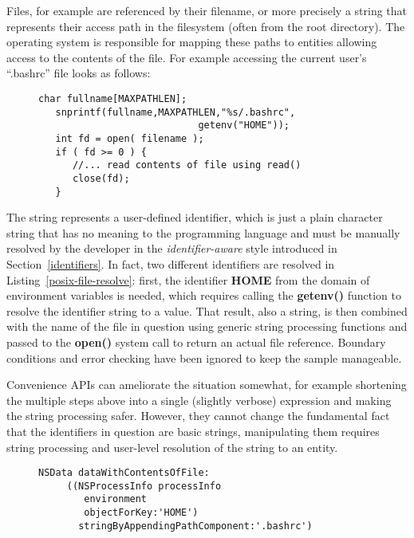 \documentclass[preprint,authoryear]{acm_proc_article-sp}
\begin{document}
Files, for example are referenced by their filename, or more precisely
a string that represents their access path in the filesystem (often from the root 
directory).  The operating system is responsible for mapping these
paths to entities allowing access to the contents of the file.  For example accessing
the current user's ``.bashrc'' file looks as follows:


\begin{figure}[htbp]
\begin{lstlisting}[style=L,label=posix-file-resolve,caption=Resolving a name to a file in the user's home directory.]
   char fullname[MAXPATHLEN];
   snprintf(fullname,MAXPATHLEN,"%s/.bashrc",
                            getenv("HOME"));
   int fd = open( filename );
   if ( fd >= 0 ) { 
      //... read contents of file using read()
      close(fd);
   }
\end{lstlisting}
\end{figure}

The string represents a user-defined identifier, which is just a plain character
string that has no meaning to the programming language and must be 
manually resolved by the developer in the {\em identifier-aware} style 
introduced in Section~\ref{identifiers}.  In fact, two different identifiers
are resolved in Listing~\ref{posix-file-resolve}:  first, the identifier {\bf HOME}
from the domain of environment variables is needed, which requires calling
the {\bf getenv()} function to resolve the identifier string to a value.  That result,
also a string, is then combined with the name of the file in question using generic
string processing functions and passed
to the {\bf open()} system call to return an actual file reference.  Boundary conditions
and error checking have been ignored to keep the sample manageable.

Convenience APIs can ameliorate the situation somewhat, for example shortening 
the multiple steps above into a single (slightly verbose) expression and making the
string processing safer.  However, they cannot
change the fundamental fact that the identifiers in question are basic strings,
manipulating them requires string processing and user-level resolution of the
string to an entity.


\begin{figure}[htbp]
\begin{lstlisting}[style=L,label=cocoa-file-contents,caption=Cocoa convenience API for accessing file contents.]
   NSData dataWithContentsOfFile:
     ((NSProcessInfo processInfo
        environment 
        objectForKey:'HOME') 
       stringByAppendingPathComponent:'.bashrc')
\end{lstlisting}
\end{figure}
\end{document}
